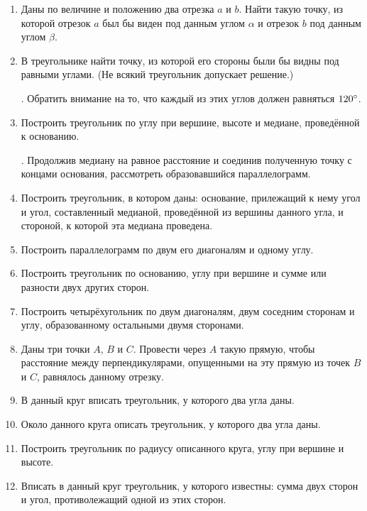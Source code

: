 {\begin{enumerate}
\item
Даны по величине и положению два отрезка $a$ и $b$.
Найти такую точку, из которой отрезок $a$ был бы виден под данным углом $\alpha$ и отрезок $b$ под данным углом $\beta$.

\item
В треугольнике найти точку, из которой его стороны были бы видны под равными углами.
(Не всякий треугольник допускает решение.)

\smallskip
{}.
Обратить внимание на то, что каждый из этих углов должен равняться $120\degree$.

\item
Построить треугольник по углу при вершине, высоте и медиане, проведённой к основанию.

\smallskip
{}.
Продолжив медиану на равное расстояние и соединив полученную точку с концами основания, рассмотреть образовавшийся параллелограмм.

\item
Построить треугольник, в котором даны:
основание, прилежащий к нему угол и угол, составленный медианой, проведённой из вершины данного угла, и стороной, к которой эта медиана проведена.

\item
Построить параллелограмм по двум его диагоналям и одному углу.

\item
Построить треугольник по основанию, углу при вершине и сумме или разности двух других сторон.

\item
Построить четырёхугольник по двум диагоналям, двум соседним сторонам и углу, образованному остальными двумя сторонами.

\item
Даны три точки $A$, $B$ и $C$.
Провести через $A$ такую прямую, чтобы расстояние между перпендикулярами, опущенными на эту прямую из точек $B$ и $C$, равнялось данному отрезку.

\item
В данный круг вписать треугольник, у которого два угла даны.

\item
Около данного круга описать треугольник, у которого два угла даны.

\item
Построить треугольник по радиусу описанного круга, углу при вершине и высоте.

\item
Вписать в данный круг треугольник, у которого известны:
сумма двух сторон и угол, противолежащий одной из этих сторон.


\end{enumerate}}
